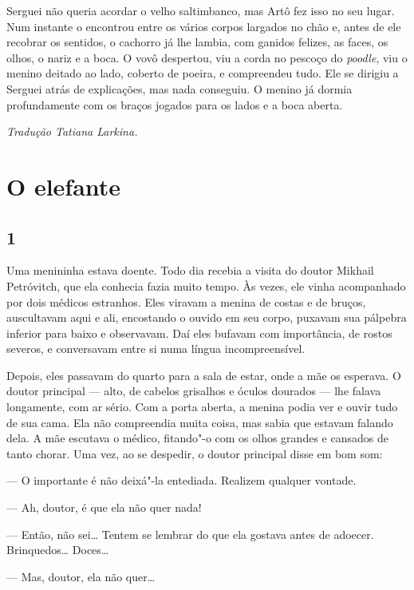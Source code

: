 Serguei não queria acordar o velho saltimbanco, mas Artô fez isso no seu
lugar. Num instante o encontrou entre os vários corpos largados no chão
e, antes de ele recobrar os sentidos, o cachorro já lhe lambia, com
ganidos felizes, as faces, os olhos, o nariz e a boca. O vovô despertou,
viu a corda no pescoço do \emph{poodle}, viu o menino deitado ao lado,
coberto de poeira, e compreendeu tudo. Ele se dirigiu a Serguei atrás de
explicações, mas nada conseguiu. O menino já dormia profundamente com os
braços jogados para os lados e a boca aberta.


\medskip

{\footnotesize\hfill\emph{Tradução Tatiana Larkina.}}

\chapter{O elefante}\label{part11}

\section{1}

\noindent{}Uma menininha estava doente. Todo dia recebia a visita do doutor
Mikhail Petróvitch, que ela conhecia fazia muito tempo. Às vezes, ele
vinha acompanhado por dois médicos estranhos. Eles viravam a menina de
costas e de bruços, auscultavam aqui e ali, encostando o ouvido em seu
corpo, puxavam sua pálpebra inferior para baixo e observavam. Daí eles
bufavam com importância, de rostos severos, e conversavam entre si numa
língua incompreensível.

Depois, eles passavam do quarto para a sala de estar, onde a mãe os
esperava. O doutor principal --- alto, de cabelos grisalhos e óculos
dourados --- lhe falava longamente, com ar sério. Com a porta aberta, a
menina podia ver e ouvir tudo de sua cama. Ela não compreendia muita
coisa, mas sabia que estavam falando dela. A mãe escutava o médico,
fitando"-o com os olhos grandes e cansados de tanto chorar. Uma vez, ao
se despedir, o doutor principal disse em bom som:

--- O importante é não deixá"-la entediada. Realizem qualquer vontade.

--- Ah, doutor, é que ela não quer nada!

--- Então, não sei\ldots{} Tentem se lembrar do que ela gostava antes de
adoecer. Brinquedos\ldots{} Doces\ldots{}

--- Mas, doutor, ela não quer\ldots{}

